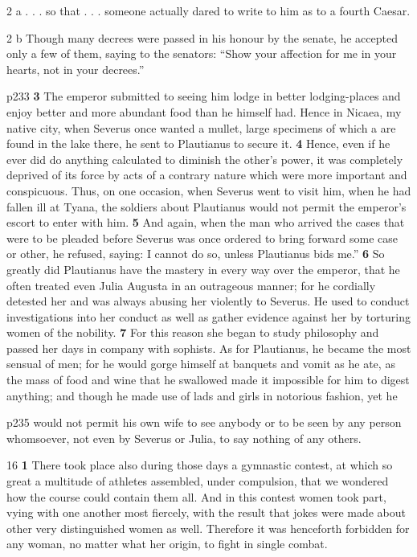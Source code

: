 2 a . . . so that . . . someone actually dared to write to him as to a fourth Caesar.

2 b Though many decrees were passed in his honour by the senate, he accepted only a few of them, saying to the senators: ``Show your affection for me in your hearts, not in your decrees.''

p233
\textbf{3} The emperor submitted to seeing him lodge in better lodging-places and enjoy better and more abundant food than he himself had. Hence in Nicaea, my native city, when Severus once wanted a mullet, large specimens of which\texthebrew{⁠} a are found in the lake there, he sent to Plautianus to secure it. \textbf{4} Hence, even if he ever did do anything calculated to diminish the other's power, it was completely deprived of its force by acts of a contrary nature which were more important and conspicuous. Thus, on one occasion, when Severus went to visit him, when he had fallen ill at Tyana, the soldiers about Plautianus would not permit the emperor's escort to enter with him. \textbf{5} And again, when the man who arrived the cases that were to be pleaded before Severus was once ordered to bring forward some case or other, he refused, saying: I cannot do so, unless Plautianus bids me.'' \textbf{6} So greatly did Plautianus have the mastery in every way over the emperor, that he often treated even Julia Augusta in an outrageous manner; for he cordially detested her and was always abusing her violently to Severus. He used to conduct investigations into her conduct as well as gather evidence against her by torturing women of the nobility. \textbf{7} For this reason she began to study philosophy and passed her days in company with sophists. As for Plautianus, he became the most sensual of men; for he would gorge himself at banquets and vomit as he ate, as the mass of food and wine that he swallowed made it impossible for him to digest anything; and though he made use of lads and girls in notorious fashion, yet he

p235 would not permit his own wife to see anybody or to be seen by any person whomsoever, not even by Severus or Julia, to say nothing of any others.

16
\textbf{1} There took place also during those days a gymnastic contest, at which so great a multitude of athletes assembled, under compulsion, that we wondered how the course could contain them all. And in this contest women took part, vying with one another most fiercely, with the result that jokes were made about other very distinguished women as well. Therefore it was henceforth forbidden for any woman, no matter what her origin, to fight in single combat.


